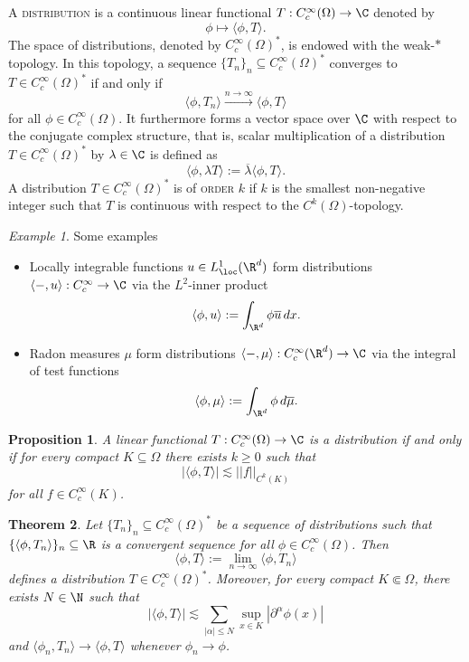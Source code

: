 \documentclass[reqno]{amsart}
\newtheorem{theorem}{Theorem}
\newtheorem{proposition}[theorem]{Proposition}
\theoremstyle{definition}
\theoremstyle{remark}
\newtheorem*{example}{Example}
\renewcommand{\emph}{\textsc}
\begin{document}
A \emph{distribution} is a continuous linear functional $T: C^\infty_c (\Omega) \to \C$ denoted by 
	\[ \phi \mapsto \langle \phi, T \rangle. \]
The space of distributions, denoted by $C^\infty_c (\Omega)^*$, is endowed with the weak-$*$ topology. In this topology, a sequence $\{ T_n\}_n \subseteq C^\infty_c (\Omega)^*$ converges to $T \in C^\infty_c (\Omega)^*$ if and only if 
	\[ \langle \phi, T_n \rangle \overset{n \to \infty}{\longrightarrow} \langle \phi, T \rangle \]
for all $\phi \in C^\infty_c (\Omega)$. It furthermore forms a vector space over $\C$ with respect to the conjugate complex structure, that is, scalar multiplication of a distribution $T \in C^\infty_c (\Omega)^*$ by $\lambda \in \C$ is defined as 
	\[ \langle \phi, \lambda T \rangle := \overline \lambda \langle \phi, T \rangle. \]
A distribution $T \in C^\infty_c (\Omega)^*$ is of \emph{order} $k$ if $k$ is the smallest non-negative integer such that $T$ is continuous with respect to the $C^k (\Omega)$-topology. 
	
	
\begin{example}
Some examples
\begin{itemize}
	\item Locally integrable functions $u \in L^1_{\loc} (\R^d)$ form distributions $\langle -, u \rangle : C^\infty_c \to \C$ via the $L^2$-inner product
			\[ \langle \phi, u \rangle := \int_{\R^d} \phi \overline u \, d x. \]
	
	\item Radon measures $\mu$ form distributions $\langle -, \mu \rangle : C_c^\infty (\R^d) \to \C$ via the integral of test functions  
				\[ \langle \phi , \mu \rangle := \int_{\R^d} \phi \, d \overline\mu. \]
			
	
\end{itemize}
\end{example}	
	
	
\begin{proposition}
	A linear functional $T : C^\infty_c (\Omega) \to \C$ is a distribution if and only if for every compact $K \subseteq \Omega$ there exists $k \geq 0$ such that 
		\[ |\langle \phi, T \rangle | \lesssim ||f||_{C^k (K)} \]
	for all $f \in C^\infty_c (K)$. 	
\end{proposition}	


\begin{theorem}
	Let $\{T_n\}_n \subseteq C^\infty_c (\Omega)^*$ be a sequence of distributions such that $\{ \langle \phi, T_n \rangle \}_n \subseteq \R$ is a convergent sequence for all $\phi \in C^\infty_c (\Omega)$. Then 
		\[ \langle \phi, T \rangle := \lim_{n \to \infty} \langle \phi, T_n \rangle \]
	defines a distribution $T \in C^\infty_c (\Omega)^*$. Moreover, for every compact $K \Subset \Omega$, there exists $N \in \N$ such that 
		\[ |\langle \phi, T \rangle| \lesssim \sum_{|\alpha| \leq N} \sup_{x \in K} |\partial^\alpha \phi (x)| \]
	and $\langle \phi_n, T_n \rangle \to \langle \phi, T \rangle$ whenever $\phi_n \to \phi$. 	
\end{theorem}
\end{document}
